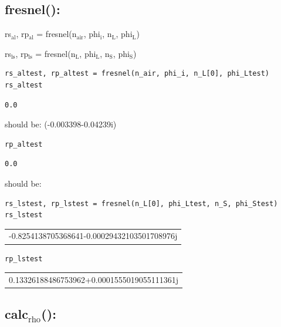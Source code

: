 \documentclass[11pt]{article}
\begin{document}
\subsection{fresnel():}
\label{sec:org5b06459}

rs\(_{\text{al}}\), rp\(_{\text{al}}\) = fresnel(n\(_{\text{air}}\), phi\(_{\text{i}}\), n\(_{\text{L}}\), phi\(_{\text{L}}\))

rs\(_{\text{ls}}\), rp\(_{\text{ls}}\) = fresnel(n\(_{\text{L}}\), phi\(_{\text{L}}\), n\(_{\text{S}}\), phi\(_{\text{S}}\))

\begin{verbatim}
rs_altest, rp_altest = fresnel(n_air, phi_i, n_L[0], phi_Ltest)
rs_altest
\end{verbatim}

\begin{verbatim}
0.0
\end{verbatim}
should be: (-0.003398-0.04239i)
\begin{verbatim}
rp_altest
\end{verbatim}

\begin{verbatim}
0.0
\end{verbatim}
should be: 

\begin{verbatim}
rs_lstest, rp_lstest = fresnel(n_L[0], phi_Ltest, n_S, phi_Stest)
rs_lstest
\end{verbatim}

\begin{center}
\begin{tabular}{l}
-0.8254138705368641-0.00029432103501708976j\\
\end{tabular}
\end{center}

\begin{verbatim}
rp_lstest
\end{verbatim}

\begin{center}
\begin{tabular}{l}
0.13326188486753962+0.0001555019055111361j\\
\end{tabular}
\end{center}

\subsection{calc\(_{\text{rho}}\)():}
\label{sec:orgb7a6c55}
\end{document}
